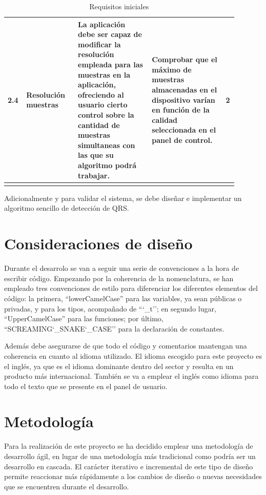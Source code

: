 \begin{scriptsize}
\begin{longtable}{|p{0.05\linewidth}|p{0.21\linewidth}|p{0.3\linewidth}|p{0.3\linewidth}|p{0.03\linewidth}|}
        2.4     & Resolución muestras & La aplicación debe ser capaz de modificar la resolución empleada para las muestras en la aplicación, ofreciendo al usuario cierto control sobre la cantidad de muestras simultaneas con las que su algoritmo podrá trabajar. & Comprobar que el máximo de muestras almacenadas en el dispositivo varían en función de la calidad seleccionada en el panel de control. & 2 \\ \hline
        \caption{Requisitos iniciales}
        \label{tab:Requisitos}
    \end{longtable}        
    \end{scriptsize}
    
    Adicionalmente y para validar el sistema, se debe diseñar e implementar un algoritmo sencillo de detección de QRS. 
    \clearpage

\section{Consideraciones de diseño}

    Durante el desarrolo se van a seguir una serie de convenciones a la hora de escribir código. Empezando por la coherencia de la nomenclatura, se han empleado tres convenciones de estilo para diferenciar los diferentes elementos del código: la primera,  ``lowerCamelCase'' para las variables, ya sean públicas o privadas, y para los tipos, acompañado de ``\char`_t''; en segundo lugar, ``UpperCamelCase'' para las funciones; por último,  ``SCREAMING\char`_SNAKE\char`_CASE'' para la declaración de constantes.
        
    Además debe asegurarse de que todo el código y comentarios mantengan una coherencia en cuanto al idioma utilizado. El idioma escogido para este proyecto es el inglés, ya que es el idioma dominante dentro del sector y resulta en un producto más internacional. También se va a emplear el inglés como idioma para todo el texto que se presente en el panel de usuario.

\section{Metodología}

    Para la realización de este proyecto se ha decidido emplear una metodología de desarrollo ágil, en lugar de una metodología más tradicional como podría ser un desarrollo en cascada. El carácter iterativo e incremental de este tipo de diseño permite reaccionar más rápidamente a los cambios de diseño o nuevas necesidades que se encuentren durante el desarrollo.

